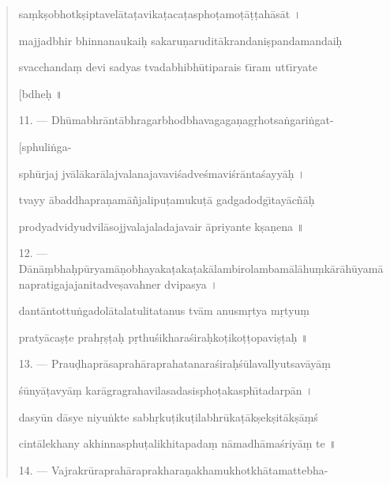 \documentclass[a4paper, 11pt, oneside, french]{article}
\begin{document}
\begin{quotation}
sa\d{m}k\d{s}obhotk\d{s}iptavel\={a}ta\d{t}avika\d{t}aca\d{t}aspho\d{t}amo\d{t}\={a}\d{t}\d{t}ah\={a}s\={a}t \texthindi{।}

majjadbhir bhinnanaukai\d{h} sakaru\d{n}arudit\={a}krandani\d{s}pandamandai\d{h}

svacchanda\d{m} devi sadyas tvadabhibh\={u}tiparais t\={\i}ram utt\={\i}ryate

\hspace*{25mm}[bdhe\d{h} \texthindi{॥}

\bigskip

11. --- Dh\={u}mabhr\={a}nt\={a}bhragarbhodbhavagaga\d{n}ag\d{r}hotsa\.{n}gari\.{n}gat-

\hspace*{25mm}[sphuli\.{n}ga-

sph\={u}rjaj jv\={a}l\={a}kar\={a}lajvalanajavavi\'{s}adve\'{s}mavi\'{s}r\={a}nta\'{s}ayy\={a}\d{h} \texthindi{।}

tvayy \={a}baddhapra\d{n}am\={a}\~{n}jalipu\d{t}amuku\d{t}\={a} gadgadodg\={\i}tay\={a}c\~{n}\={a}\d{h}

prodyadvidyudvil\={a}sojjvalajaladajavair \={a}priyante k\d{s}a\d{n}ena \texthindi{॥}

\bigskip

12. --- D\={a}n\={a}\d{m}bha\d{h}p\={u}ryam\={a}\d{n}obhayaka\d{t}aka\d{t}ak\={a}lambirolambam\={a}l\={a}hu\d{m}k\={a}r\={a}h\={u}yam\={a}napratigajajanitadve\d{s}avahner dvipasya \texthindi{।}

dant\={a}ntottu\.{n}gadol\={a}talatulitatanus tv\={a}m anusm\d{r}tya m\d{r}tyu\d{m}

praty\={a}ca\d{s}\d{t}e prah\d{r}\d{s}\d{t}a\d{h} p\d{r}thu\'{s}ikhara\'{s}ira\d{h}ko\d{t}iko\d{t}\d{t}opavi\d{s}\d{t}a\d{h} \texthindi{॥}

\bigskip

13. --- Prau\d{d}hapr\={a}saprah\={a}raprahatanara\'{s}ira\d{h}\'{s}\={u}lavallyutsav\={a}y\={a}\d{m}

\'{s}\={u}ny\={a}\d{t}avy\={a}\d{m} kar\={a}gragrahavilasadasispho\d{t}akasph\={\i}tadarp\={a}n \texthindi{।}

dasy\={u}n d\={a}sye niyu\.{n}kte sabh\d{r}ku\d{t}iku\d{t}ilabhr\={u}ka\d{t}\={a}k\d{s}ek\d{s}it\={a}k\d{s}\={a}\d{m}\'{s}

cint\={a}lekhany akhinnasphu\d{t}alikhitapada\d{m} n\={a}madh\={a}ma\'{s}riy\={a}\d{m} te \texthindi{॥}

\bigskip

14. --- Vajrakr\={u}raprah\={a}raprakhara\d{n}akhamukhotkh\={a}tamattebha-


\end{quotation}
\end{document}

